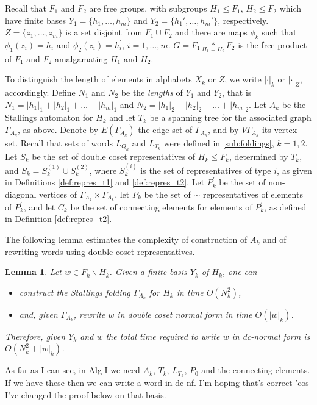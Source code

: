\documentclass[a4paper,12pt]{article}
\newcommand{\G}{\Gamma }
\newtheorem{lemma}[theorem]{Lemma}
\numberwithin{equation}{section}
\numberwithin{figure}{section}
\begin{document}
Recall that $F_1$ and  $F_2$ are free groups, with subgroups $H_1 \leq
F_1$, $H_2 \leq F_2$ which have finite bases $Y_1 = \{h_1, \ldots, h_m
\}$ and $Y_2=\{h_1', \ldots, h_m'\}$, respectively.  $Z=\{z_1,\ldots ,z_m\}$
is a set disjoint from $F_1\cup F_2$ and there are
maps $\phi_k$ such that $\phi_1(z_i)=h_i$ and
$\phi_2(z_i)=h^\prime_i$, $i=1,\ldots ,m$.
 $G = F_1 \underset{H_1=H_2}{\ast} F_2$ is the free product of $F_1$ and $F_2$
amalgamating $H_1$ and $H_2$.

To distinguish the length of elements in alphabets $X_k$ or
$Z$, we write $|\cdot|_k$ or $|\cdot|_Z$, accordingly. Define  $N_1$ and $N_2$
be the \emph{lengths} of $Y_1$ and $Y_2$, that is
$N_1 = |h_1|_1 + |h_2|_1 + \ldots + |h_m|_1$ and $N_2 = |h_1|_2 +
|h_2|_2 + \ldots + |h_m|_2$. Let $A_k$ be the Stallings automaton
for $H_k$ and let $T_k$ be a spanning tree for the associated
graph $\G_{A_k}$, as above. Denote by $E(\G_{A_k})$ the  edge set
of $\G_{A_k}$, and by $V\G_{A_k}$  its vertex set.
Recall that sets of words  $L_{Q_k}$ and $L_{T_k}$
were defined in \ref{sub:foldings}, $k=1,2$. Let $S_k$ be the set of
double coset representatives of $H_k\le F_k$, determined by $T_k$, and
 $S_k=S_k^{(1)}\cup S_k^{(2)}$, where $S_k^{(i)}$ is the set
of representatives of type $i$, as given in Definitions \ref{def:repres_t1}
and \ref{def:repres_t2}.  Let $P_k^\prime$ be the set of non-diagonal
vertices of $\G_{A_k}\times \G_{A_k}$, let $P_k$ be the set of
$\sim$ representatives of elements of $P_k^\prime$, and let $C_k$ be
the set of connecting elements for elements of $P_k^\prime$, as defined in
Definition \ref{def:repres_t2}.


The following lemma estimates the complexity of
construction of $A_k$ and of rewriting words using
double coset representatives.
\begin{lemma}\label{lem:dctransversal} Let $w \in F_k \smallsetminus H_k$. Given a finite basis $Y_k$ of $H_k$, one can
\begin{itemize}
\item construct the Stallings folding $\G_{A_k}$ for $H_k$ in time $O(N_k^2)$,
\item and, given $\G_{A_k}$,
rewrite $w$ in  double coset normal
form in time  $O(|w|_k)$.
\end{itemize}
Therefore, given $Y_k$ and $w$ the total time required to write $w$ in dc-normal
 form is  $O(N_k^2 + |w|_k)$.
\end{lemma}

{\ajd As far as I can see, in Alg I we need $A_k$, $T_k$, $L_{T_k}$, $P_0$ and the connecting elements. If
 we have these then we can write a word in dc-nf. I'm hoping that's correct
'cos I've changed the proof below on that basis.}
\end{document}
